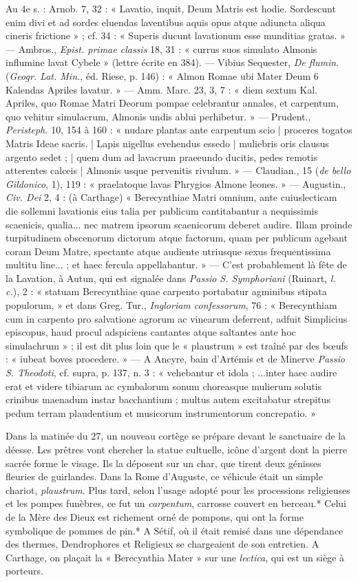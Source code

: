 \documentclass[a4paper, 11pt, oneside, polutonikogreek, french]{article}
\begin{document}
Au 4e s. : Arnob. 7, 32 : « Lavatio, inquit, Deum Matris est hodie. Sordescunt enim divi et ad sordes eluendas laventibus aquis opus atque adiuncta aliqua cineris frictione » ; cf. 34 : « Superis ducunt lavationum esse munditias gratas. » --- Ambros., \emph{Epist. primae classis} 18, 31 : « currus suos simulato Almonis influmine lavat Cybele » (lettre écrite en 384). --- Vibius Sequester, \emph{De flumin.} (\emph{Geogr. Lat. Min.}, éd. Riese, p. 146) : « Almon Romae ubi Mater Deum 6 Kalendas Apriles lavatur. » --- Amm. Marc. 23, 3, 7 : « diem sextum Kal. Apriles, quo Romae Matri Deorum pompae celebrantur annales, et carpentum, quo vehitur simulacrum, Almonis undis ablui perhibetur. » --- Prudent., \emph{Peristeph.} 10, 154 à 160 : « nudare plantas ante carpentum scio | proceres togatos Matris Ideae sacris. | Lapis nigellus evehendus essedo | muliebris oris clausus argento sedet ; | quem dum ad lavacrum praeeundo ducitis, pedes remotis atterentes calceis | Almonis usque pervenitis rivulum. » --- Claudian., 15 (\emph{de bello Gildonico}, 1), 119 : « praelatoque lavas Phrygios Almone leones. » --- Augustin., \emph{Civ. Dei} 2, 4 : (à Carthage) « Berecynthiae Matri omnium, ante cuiuslecticam die sollemni lavationis eius talia per publicum cantitabantur a nequissimis scaenicis, qualia... nec matrem ipsorum scaenicorum deberet audire. Illam proinde turpitudinem obscenorum dictorum atque factorum, quam per publicum agebant coram Deum Matre, spectante atque audiente utriusque sexus frequentissima multitu line... ; et haec fercula appellabantur. » --- C'est probablement là fête de la Lavation, à Autun, qui est signalée dans \emph{Passio S. Symphoriani} (Ruinart, \emph{l. c.}), 2 : « statuam Berecynthiae quae carpento portabatur agminibus stipata populorum, » et dans Greg. Tur., \emph{Ingloriam confessorum}, 76 : « Berecynthiam cum in carpento pro salvatione agrorum ac vinearum deferrent, adfuit Simplicius episcopus, haud procul adspiciens cantantes atque saltantes ante hoc simulachrum » ; il est dit plus loin que le « plaustrum » est traîné par des bœufs : « iubeat boves procedere. » --- A Ancyre, bain d'Artémis et de Minerve \emph{Passio S. Theodoti}, cf. supra, p. 137, n. 3 : « vehebantur et idola ; ...inter haec audire erat et videre tibiarum ac cymbalorum sonum choreasque mulierum solutis crinibus maenadum instar bacchantium ; multus autem excitabatur strepitus pedum terram plaudentium et musicorum instrumentorum concrepatio. »

Dans la matinée du 27, un nouveau cortège se prépare devant le sanctuaire de la déesse. Les prêtres vont chercher la statue cultuelle, icône d'argent dont la pierre sacrée forme le visage. Ils la déposent sur un char, que tirent deux génisses fleuries de guirlandes. Dans la Rome d'Auguste, ce véhicule était un simple chariot, \emph{plaustrum}. Plus tard, selon l'usage adopté pour les processions religieuses et les pompes funèbres, ce fut un \emph{carpentum}, carrosse couvert en berceau.* Celui de la Mère des Dieux est richement orné de pompons, qui ont la forme symbolique de pommes de pin.* A Sétif, où il était remisé dans une dépendance des thermes, Dendrophores et Religieux se chargeaient de son entretien. A Carthage, on plaçait la « Berecynthia Mater » sur une \emph{lectica}, qui est un siège à porteurs.
\end{document}
